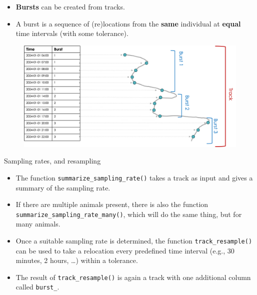\documentclass[ignorenonframetext,,t]{beamer}
\let\oldtextbf\textbf
\renewcommand{\textbf}[1]{\textcolor{spamwell}{\oldtextbf{#1}}}
\providecommand{\tightlist}{%
\setlength{\itemsep}{0pt}\setlength{\parskip}{0pt}}
\providecommand{\tightlist}{%
\setlength{\itemsep}{0pt}\setlength{\parskip}{0pt}}
\renewcommand{\tightlist}{\setlength{\itemsep}{1.4ex}\setlength{\parskip}{0pt}}
\begin{document}
\begin{frame}
\begin{itemize}
\tightlist
\item
  \textbf{Bursts} can be created from tracks.
\item
  A burst is a sequence of (re)locations from the \textbf{same}
  individual at \textbf{equal} time intervals (with some tolerance).
\end{itemize}

\begin{figure}

{\centering \includegraphics[width=0.85\linewidth]{../img/track_burst} 

}

\end{figure}
\end{frame}

\begin{frame}[fragile]{Sampling rates, and resampling}
\label{sampling-rates-and-resampling}
\begin{itemize}
\tightlist
\item
  The function \texttt{summarize\_sampling\_rate()} takes a track as
  input and gives a summary of the sampling rate.
\item
  If there are multiple animals present, there is also the function
  \texttt{summarize\_sampling\_rate\_many()}, which will do the same
  thing, but for many animals.
\end{itemize}
\end{frame}

\begin{frame}[fragile]
\begin{itemize}
\tightlist
\item
  Once a suitable sampling rate is determined, the function
  \texttt{track\_resample()} can be used to take a relocation every
  predefined time interval (e.g., 30 minutes, 2 hours, \ldots) within a
  tolerance.
\item
  The result of \texttt{track\_resample()} is again a track with one
  additional column called \texttt{burst\_}.
\end{itemize}
\end{frame}
\end{document}
